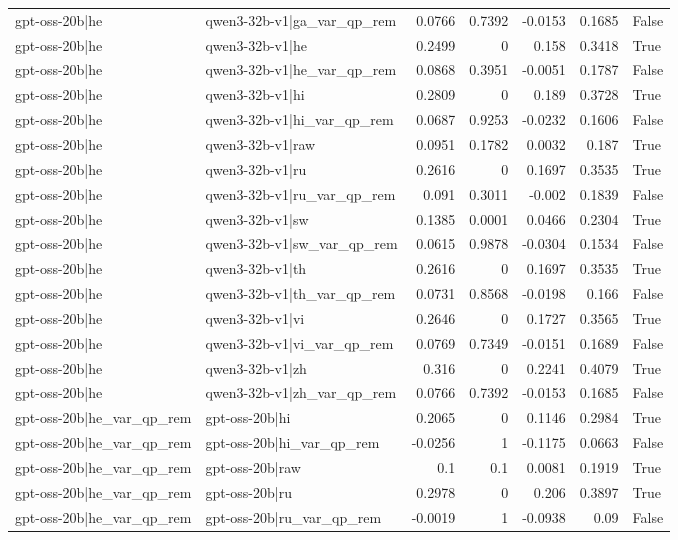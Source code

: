 \begin{table}
\begin{tabular}{l l r r r r l}
gpt-oss-20b|he & qwen3-32b-v1|ga_var_qp_rem & 0.0766 & 0.7392 & -0.0153 & 0.1685 & False \\
gpt-oss-20b|he & qwen3-32b-v1|he & 0.2499 & 0 & 0.158 & 0.3418 & True \\
gpt-oss-20b|he & qwen3-32b-v1|he_var_qp_rem & 0.0868 & 0.3951 & -0.0051 & 0.1787 & False \\
gpt-oss-20b|he & qwen3-32b-v1|hi & 0.2809 & 0 & 0.189 & 0.3728 & True \\
gpt-oss-20b|he & qwen3-32b-v1|hi_var_qp_rem & 0.0687 & 0.9253 & -0.0232 & 0.1606 & False \\
gpt-oss-20b|he & qwen3-32b-v1|raw & 0.0951 & 0.1782 & 0.0032 & 0.187 & True \\
gpt-oss-20b|he & qwen3-32b-v1|ru & 0.2616 & 0 & 0.1697 & 0.3535 & True \\
gpt-oss-20b|he & qwen3-32b-v1|ru_var_qp_rem & 0.091 & 0.3011 & -0.002 & 0.1839 & False \\
gpt-oss-20b|he & qwen3-32b-v1|sw & 0.1385 & 0.0001 & 0.0466 & 0.2304 & True \\
gpt-oss-20b|he & qwen3-32b-v1|sw_var_qp_rem & 0.0615 & 0.9878 & -0.0304 & 0.1534 & False \\
gpt-oss-20b|he & qwen3-32b-v1|th & 0.2616 & 0 & 0.1697 & 0.3535 & True \\
gpt-oss-20b|he & qwen3-32b-v1|th_var_qp_rem & 0.0731 & 0.8568 & -0.0198 & 0.166 & False \\
gpt-oss-20b|he & qwen3-32b-v1|vi & 0.2646 & 0 & 0.1727 & 0.3565 & True \\
gpt-oss-20b|he & qwen3-32b-v1|vi_var_qp_rem & 0.0769 & 0.7349 & -0.0151 & 0.1689 & False \\
gpt-oss-20b|he & qwen3-32b-v1|zh & 0.316 & 0 & 0.2241 & 0.4079 & True \\
gpt-oss-20b|he & qwen3-32b-v1|zh_var_qp_rem & 0.0766 & 0.7392 & -0.0153 & 0.1685 & False \\
gpt-oss-20b|he_var_qp_rem & gpt-oss-20b|hi & 0.2065 & 0 & 0.1146 & 0.2984 & True \\
gpt-oss-20b|he_var_qp_rem & gpt-oss-20b|hi_var_qp_rem & -0.0256 & 1 & -0.1175 & 0.0663 & False \\
gpt-oss-20b|he_var_qp_rem & gpt-oss-20b|raw & 0.1 & 0.1 & 0.0081 & 0.1919 & True \\
gpt-oss-20b|he_var_qp_rem & gpt-oss-20b|ru & 0.2978 & 0 & 0.206 & 0.3897 & True \\
gpt-oss-20b|he_var_qp_rem & gpt-oss-20b|ru_var_qp_rem & -0.0019 & 1 & -0.0938 & 0.09 & False \\

\end{tabular}
\end{table}
